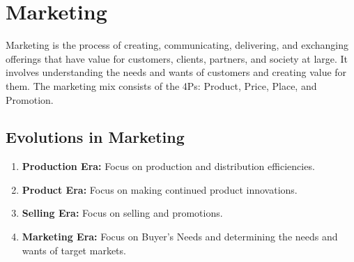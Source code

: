 \section{Marketing}
Marketing is the process of creating, communicating, delivering, and exchanging offerings that have value for customers, clients, partners, and society at large. It involves understanding the needs and wants of customers and creating value for them. The marketing mix consists of the 4Ps: Product, Price, Place, and Promotion.

\subsection{Evolutions in Marketing}
\begin{enumerate}
	\item \textbf{Production Era:} Focus on production and distribution efficiencies.
	\item \textbf{Product Era:} Focus on making continued product innovations.
	\item \textbf{Selling Era:} Focus on selling and promotions.
	\item \textbf{Marketing Era:} Focus on Buyer's Needs and determining the needs and wants of target markets.
\end{enumerate}
\begin{center}

\end{center}

